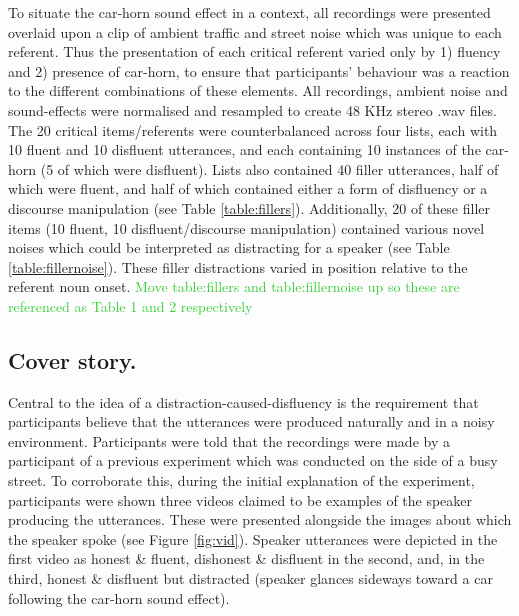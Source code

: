 \documentclass[man]{apa6}
\newcommand\thenote[1]{\textcolor{LimeGreen}{#1}}
\begin{document}
To situate the car-horn sound effect in a context, all recordings were presented overlaid upon a clip of ambient traffic and street noise which was unique to each referent. 
Thus the presentation of each critical referent varied only by 1) fluency and 2) presence of car-horn, to ensure that participants' behaviour was a reaction to the different combinations of these elements. 
All recordings, ambient noise and sound-effects were normalised and resampled to create 48 KHz stereo .wav files.\\

The 20 critical items/referents were counterbalanced across four lists, each with 10 fluent and 10 disfluent utterances, and each containing 10 instances of the car-horn (5 of which were disfluent). 
Lists also contained 40 filler utterances, half of which were fluent, and half of which contained either a form of disfluency or a discourse manipulation (see Table \ref{table:fillers}). 
Additionally, 20 of these filler items (10 fluent, 10 disfluent/discourse manipulation) contained various novel noises which could be interpreted as distracting for a speaker (see Table \ref{table:fillernoise}). 
These filler distractions varied in position relative to the referent noun onset.
\thenote{Move table:fillers and table:fillernoise up so these are referenced as Table 1 and 2 respectively}

\subsection{Cover story.}
Central to the idea of a distraction-caused-disfluency is the requirement that participants believe that the utterances were produced naturally and in a noisy environment. 
Participants were told that the recordings were made by a participant of a previous experiment which was conducted on the side of a busy street. 
To corroborate this, during the initial explanation of the experiment, participants were shown three videos claimed to be examples of the speaker producing the utterances. 
These were presented alongside the images about which the speaker spoke (see Figure \ref{fig:vid}). 
Speaker utterances were depicted in the first video as honest \& fluent, dishonest \& disfluent in the second, and, in the third, honest \& disfluent but distracted (speaker glances sideways toward a car following the car-horn sound effect).\\
\end{document}
